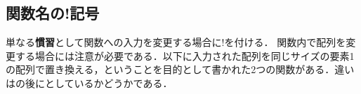 \subsection{関数名の!記号}単なる\textbf{慣習}として関数への入力を変更する場合に!を付ける．
関数内で配列を変更する場合には注意が必要である．以下に入力された配列を同じサイズの要素1の配列で置き換える，ということを目的として書かれた2つの関数がある．違いはの後に\jl{[:]}としているかどうかである．